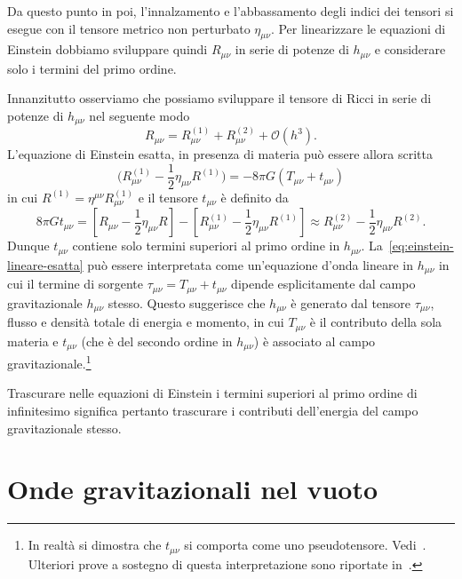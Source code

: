 Da questo punto in poi, l'innalzamento e l'abbassamento degli indici dei tensori
si esegue con il tensore metrico non perturbato $\eta_{\mu\nu}$.  Per
linearizzare le equazioni di Einstein dobbiamo sviluppare quindi $R_{\mu\nu}$ in
serie di potenze di $h_{\mu\nu}$ e considerare solo i termini del primo ordine.

Innanzitutto osserviamo che possiamo sviluppare il tensore di Ricci in serie di
potenze di $h_{\mu\nu}$ nel seguente modo
\begin{equation}
  R_{\mu\nu} = R_{\mu\nu}^{(1)} + R_{\mu\nu}^{(2)} + \mathcal{O}(h^{3}).
\end{equation}
L'equazione di Einstein esatta, in presenza di materia può essere allora scritta
\begin{equation}
  \label{eq:einstein-lineare-esatta}
  \bigg(R_{\mu\nu}^{(1)} - \frac{1}{2}\eta_{\mu\nu}R^{(1)}\bigg) = -8\pi
  G(T_{\mu\nu} + t_{\mu\nu})
\end{equation}
in cui $R^{(1)} = \eta^{\mu\nu}R_{\mu\nu}^{(1)}$ e il tensore $t_{\mu\nu}$ è
definito da
\begin{equation}
  8\pi G t_{\mu\nu} = \left[ R_{\mu\nu} - \frac{1}{2}\eta_{\mu\nu} R \right]
  - \left[R_{\mu\nu}^{(1)} - \frac{1}{2}\eta_{\mu\nu}R^{(1)} \right] \approx
  R_{\mu\nu}^{(2)} - \frac{1}{2} \eta_{\mu\nu} R^{(2)}.
\end{equation}
Dunque $t_{\mu\nu}$ contiene solo termini superiori al primo ordine in
$h_{\mu\nu}$.  La~\eqref{eq:einstein-lineare-esatta} può essere interpretata
come un'equazione d'onda lineare in $h_{\mu\nu}$ in cui il termine di sorgente
$\tau_{\mu\nu} = T_{\mu\nu} + t_{\mu\nu}$ dipende esplicitamente dal campo
gravitazionale $h_{\mu\nu}$ stesso.  Questo suggerisce che $h_{\mu\nu}$ è
generato dal tensore $\tau_{\mu\nu}$, flusso e densità totale di energia e
momento, in cui $T_{\mu\nu}$ è il contributo della sola materia e $t_{\mu\nu}$
(che è del secondo ordine in $h_{\mu\nu}$) è associato al campo
gravitazionale.\footnote{In realtà si dimostra che $t_{\mu\nu}$ si comporta come
  uno pseudotensore.  Vedi~\textcite[367-374]{landau:campi}.  Ulteriori prove a
  sostegno di questa interpretazione sono riportate
  in~\textcite[165-171]{weinberg:gravitation}.}

Trascurare nelle equazioni di Einstein i termini superiori al primo ordine di
infinitesimo significa pertanto trascurare i contributi dell'energia del campo
gravitazionale stesso.

\section{Onde gravitazionali nel vuoto}
\label{sec:onde-grav-vuoto}

